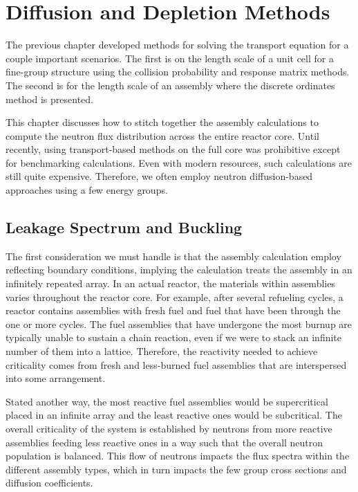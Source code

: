 \chapter{Diffusion and Depletion Methods} \label{Sec:diffusion}

The previous chapter developed methods for solving the transport equation for a couple important scenarios. The first is on the length scale of a unit cell for a fine-group structure using the collision probability and response matrix methods. The second is for the length scale of an assembly where the discrete ordinates method is presented.

This chapter discusses how to stitch together the assembly calculations to compute the neutron flux distribution across the entire reactor core. Until recently, using transport-based methods on the full core was prohibitive except for benchmarking calculations. Even with modern resources, such calculations are still quite expensive. Therefore, we often employ neutron diffusion-based approaches using a few energy groups.






\section{Leakage Spectrum and Buckling}

The first consideration we must handle is that the assembly calculation employ reflecting boundary conditions, implying the calculation treats the assembly in an infinitely repeated array. In an actual reactor, the materials within assemblies varies throughout the reactor core. For example, after several refueling cycles, a reactor contains assemblies with fresh fuel and fuel that have been through the one or more cycles. The fuel assemblies that have undergone the most burnup are typically unable to sustain a chain reaction, even if we were to stack an infinite number of them into a lattice. Therefore, the reactivity needed to achieve criticality comes from fresh and less-burned fuel assemblies that are interspersed into some arrangement. 

Stated another way, the most reactive fuel assemblies would be supercritical placed in an infinite array and the least reactive ones would be subcritical. The overall criticality of the system is established by neutrons from more reactive assemblies feeding less reactive ones in a way such that the overall neutron population is balanced. This flow of neutrons impacts the flux spectra within the different assembly types, which in turn impacts the few group cross sections and diffusion coefficients.




